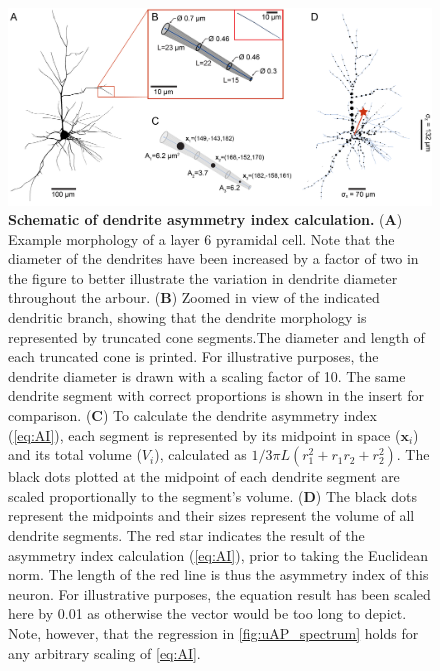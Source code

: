 \begin{figure}[h!]
    \centering
    \includegraphics[width=17cm]{Figures/chapter3/figureS7.png}
    \caption[Schematic of dendrite asymmetry index calculation]{\textbf{Schematic of dendrite asymmetry index calculation.} (\textbf{A}) Example morphology of a layer 6 pyramidal cell. Note that the diameter of the dendrites have been increased by a factor of two in the figure to better illustrate the variation in dendrite diameter throughout the arbour. (\textbf{B}) Zoomed in view of the indicated dendritic branch, showing that the dendrite morphology is represented by truncated cone segments.The diameter and length of each truncated cone is printed. For illustrative purposes, the dendrite diameter is drawn with a scaling factor of 10. The same dendrite segment with correct proportions is shown in the insert for comparison.  (\textbf{C}) To calculate the dendrite asymmetry index ({\ref{eq:AI}}), each segment is represented by its midpoint in space ($\bm{x}_i$) and its total volume ($V_i$), calculated as $1/3 \pi L (r_1^2 + r_1r_2 + r_2^2)$. The black dots plotted at the midpoint of each dendrite segment are scaled proportionally to the segment's volume. (\textbf{D}) The black dots represent the midpoints and their sizes represent the volume of all dendrite segments. The red star indicates the result of the asymmetry index calculation ({\ref{eq:AI}}), prior to taking the Euclidean norm. The length of the red line is thus the asymmetry index of this neuron. For illustrative purposes, the equation result has been scaled here by 0.01 as otherwise the vector would be too long to depict. Note, however, that the regression in {\autoref{fig:uAP_spectrum}} holds for any arbitrary scaling of {\ref{eq:AI}.}} 
    \label{fig:AI_fig}
\end{figure}

\clearpage

